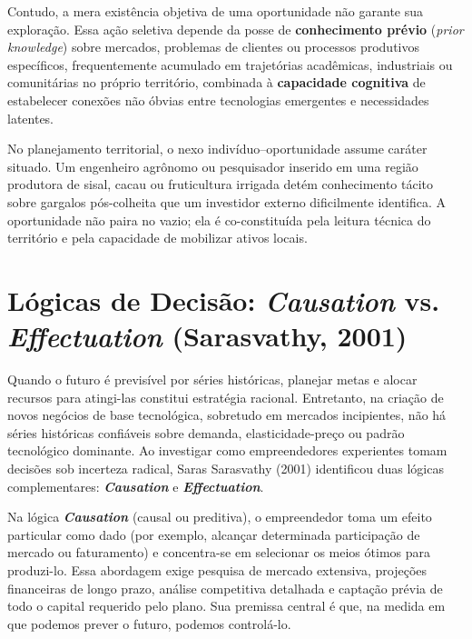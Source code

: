 Contudo, a mera existência objetiva de uma oportunidade não garante sua exploração. Essa ação seletiva depende da posse de \textbf{conhecimento prévio} (\textit{prior knowledge}) sobre mercados, problemas de clientes ou processos produtivos específicos, frequentemente acumulado em trajetórias acadêmicas, industriais ou comunitárias no próprio território, combinada à \textbf{capacidade cognitiva} de estabelecer conexões não óbvias entre tecnologias emergentes e necessidades latentes.

\begin{boxConceito}
  No planejamento territorial, o nexo indivíduo–oportunidade assume caráter situado. Um engenheiro agrônomo ou pesquisador inserido em uma região produtora de sisal, cacau ou fruticultura irrigada detém conhecimento tácito sobre gargalos pós-colheita que um investidor externo dificilmente identifica. A oportunidade não paira no vazio; ela é co-constituída pela leitura técnica do território e pela capacidade de mobilizar ativos locais.
\end{boxConceito}

\section{Lógicas de Decisão: \textit{Causation} vs. \textit{Effectuation} (Sarasvathy, 2001)}

Quando o futuro é previsível por séries históricas, planejar metas e alocar recursos para atingi-las constitui estratégia racional. Entretanto, na criação de novos negócios de base tecnológica, sobretudo em mercados incipientes, não há séries históricas confiáveis sobre demanda, elasticidade-preço ou padrão tecnológico dominante. Ao investigar como empreendedores experientes tomam decisões sob incerteza radical, Saras Sarasvathy (2001) identificou duas lógicas complementares: \textbf{\textit{Causation}} e \textbf{\textit{Effectuation}}.

Na lógica \textbf{\textit{Causation}} (causal ou preditiva), o empreendedor toma um efeito particular como dado (por exemplo, alcançar determinada participação de mercado ou faturamento) e concentra-se em selecionar os meios ótimos para produzi-lo. Essa abordagem exige pesquisa de mercado extensiva, projeções financeiras de longo prazo, análise competitiva detalhada e captação prévia de todo o capital requerido pelo plano. Sua premissa central é que, na medida em que podemos prever o futuro, podemos controlá-lo.


